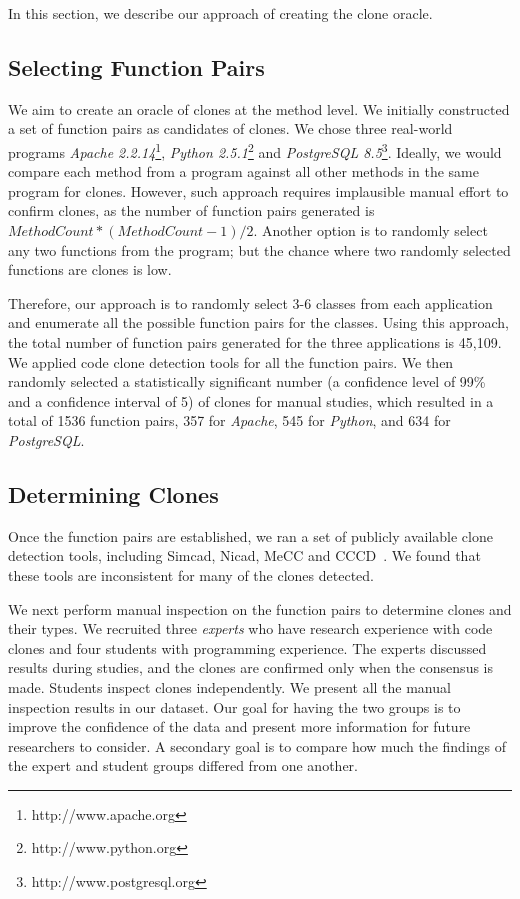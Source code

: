 \documentclass{sig-alternate}
\begin{document}
In this section, we describe our approach of creating the clone oracle.

\subsection{Selecting Function Pairs}
We aim to create an oracle of clones at the method level. We initially constructed a set of function pairs as candidates of clones. We chose three real-world programs {\it Apache 2.2.14}\footnote{http://www.apache.org}, {\it Python 2.5.1}\footnote{http://www.python.org} and {\it PostgreSQL 8.5}\footnote{http://www.postgresql.org}. Ideally, we would compare each method from a program against all other methods in the same program for clones. However, such approach requires implausible manual effort to confirm clones, as the number of function pairs generated is $Method Count *(MethodCount-1)/2$. Another option is to randomly select any two functions from the program; but the chance where two randomly selected functions are clones is low.

Therefore, our approach is to randomly select 3-6 classes from each application and enumerate all the possible function pairs for the classes. Using this approach, the total number of function pairs generated for the three applications is 45,109. We applied code clone detection tools for all the function pairs. We then randomly selected a statistically significant number (a confidence level of 99\% and a confidence interval of 5) of clones for manual studies, which resulted in a total of 1536 function pairs, 357 for {\it Apache}, 545 for {\it Python}, and 634 for {\it PostgreSQL}.


\subsection{Determining Clones}

Once the function pairs are established, we ran a set of publicly available clone detection tools, including Simcad\cite{6613857}, Nicad\cite{Roy:2008:NAD:1437898.1438600}, MeCC\cite{Kim:2011:MMC:1985793.1985835} and CCCD~\cite{wcre2013}. We found that these tools are inconsistent for many of the clones detected.

We next perform manual inspection on the function pairs to determine clones and their types. We recruited three {\it experts} who have research experience with code clones and four students with programming experience. The experts discussed results during studies, and the clones are confirmed only when the consensus is made. Students inspect clones independently. We present all the manual inspection results in our dataset. Our goal for having the two groups is to improve the confidence of the data and present more information for future researchers to consider. A secondary goal is to compare how much the findings of the expert and student groups differed from one another.
\end{document}
